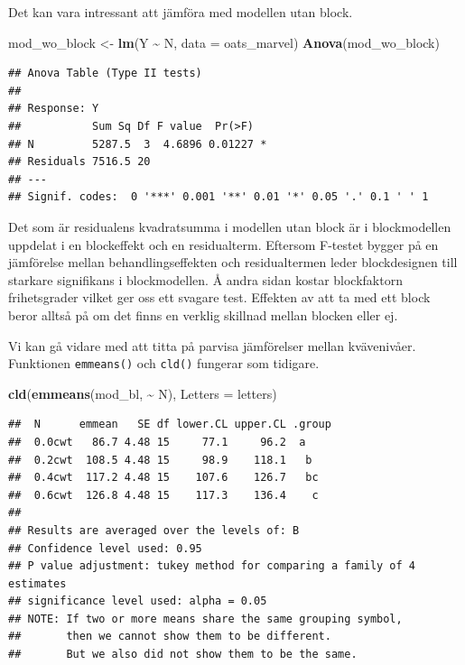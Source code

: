 \documentclass[
]{book}
\newenvironment{Shaded}{\begin{snugshade}}{\end{snugshade}}
\newcommand{\AttributeTok}[1]{\textcolor[rgb]{0.13,0.29,0.53}{#1}}
\newcommand{\FunctionTok}[1]{\textcolor[rgb]{0.13,0.29,0.53}{\textbf{#1}}}
\newcommand{\NormalTok}[1]{#1}
\newcommand{\OtherTok}[1]{\textcolor[rgb]{0.56,0.35,0.01}{#1}}
\newcommand{\SpecialCharTok}[1]{\textcolor[rgb]{0.81,0.36,0.00}{\textbf{#1}}}
\theoremstyle{definition}
\theoremstyle{definition}
\theoremstyle{definition}
\theoremstyle{definition}
\theoremstyle{remark}
\begin{document}
Det kan vara intressant att jämföra med modellen utan block.

\begin{Shaded}
\begin{Highlighting}[]
\NormalTok{mod\_wo\_block }\OtherTok{\textless{}{-}} \FunctionTok{lm}\NormalTok{(Y }\SpecialCharTok{\textasciitilde{}}\NormalTok{ N, }\AttributeTok{data =}\NormalTok{ oats\_marvel)}
\FunctionTok{Anova}\NormalTok{(mod\_wo\_block)}
\end{Highlighting}
\end{Shaded}

\begin{verbatim}
## Anova Table (Type II tests)
## 
## Response: Y
##           Sum Sq Df F value  Pr(>F)  
## N         5287.5  3  4.6896 0.01227 *
## Residuals 7516.5 20                  
## ---
## Signif. codes:  0 '***' 0.001 '**' 0.01 '*' 0.05 '.' 0.1 ' ' 1
\end{verbatim}

Det som är residualens kvadratsumma i modellen utan block är i blockmodellen uppdelat i en blockeffekt och en residualterm. Eftersom F-testet bygger på en jämförelse mellan behandlingseffekten och residualtermen leder blockdesignen till starkare signifikans i blockmodellen. Å andra sidan kostar blockfaktorn frihetsgrader vilket ger oss ett svagare test. Effekten av att ta med ett block beror alltså på om det finns en verklig skillnad mellan blocken eller ej.

Vi kan gå vidare med att titta på parvisa jämförelser mellan kvävenivåer. Funktionen \texttt{emmeans()} och \texttt{cld()} fungerar som tidigare.

\begin{Shaded}
\begin{Highlighting}[]
\FunctionTok{cld}\NormalTok{(}\FunctionTok{emmeans}\NormalTok{(mod\_bl, }\SpecialCharTok{\textasciitilde{}}\NormalTok{ N), }\AttributeTok{Letters =}\NormalTok{ letters)}
\end{Highlighting}
\end{Shaded}

\begin{verbatim}
##  N      emmean   SE df lower.CL upper.CL .group
##  0.0cwt   86.7 4.48 15     77.1     96.2  a    
##  0.2cwt  108.5 4.48 15     98.9    118.1   b   
##  0.4cwt  117.2 4.48 15    107.6    126.7   bc  
##  0.6cwt  126.8 4.48 15    117.3    136.4    c  
## 
## Results are averaged over the levels of: B 
## Confidence level used: 0.95 
## P value adjustment: tukey method for comparing a family of 4 estimates 
## significance level used: alpha = 0.05 
## NOTE: If two or more means share the same grouping symbol,
##       then we cannot show them to be different.
##       But we also did not show them to be the same.
\end{verbatim}
\end{document}
